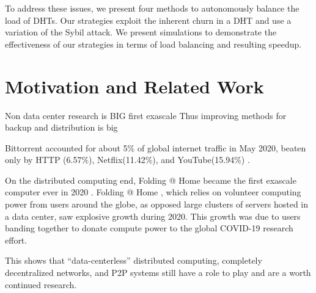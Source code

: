 \documentclass[10pt,conference]{IEEEtran}
\begin{document}
To address these issues, we present four methods to autonomously balance the load of DHTs. 
Our strategies exploit the inherent churn in a DHT and use a variation of the Sybil attack. 
We present simulations to demonstrate the effectiveness of our strategies in terms of load balancing and resulting speedup.

\section{Motivation and Related Work}

Non data center research is BIG first exascale 
\cite{sandvineCOVID2020}
Thus improving methods for backup and distribution is big



Bittorrent accounted for about 5\% of global internet traffic in May 2020, beaten only by HTTP (6.57\%), Netflix(11.42\%), and YouTube(15.94\%) \cite{sandvineCOVID2020}.

On the distributed computing end, Folding @ Home became the first exascale computer ever in 2020 \cite{Zimmerman2020.06.27.175430}  \cite{folding2020Review}.
Folding @ Home \cite{larson2002folding}, which relies on volunteer computing power from users around the globe, as opposed  large clusters of servers hosted in a data center, saw explosive growth during 2020.
This growth was due to users banding together to donate compute power to the global COVID-19 research effort.



This shows that ``data-centerless'' distributed computing, completely decentralized networks, and P2P  systems still have a role to play and are a worth continued research.

\end{document}
